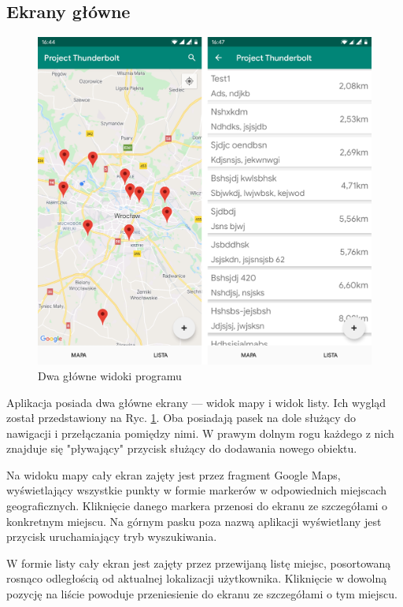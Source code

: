 \documentclass[polish,polish,a4paper,12pt]{article}
\begin{document}
	\subsection{Ekrany główne}

	\begin{figure}[H]
		\centering
		\includegraphics[width = \textwidth]{screenshot-main}
		\caption{Dwa główne widoki programu}
		\label{fig:screenshotmain}
	\end{figure}

	Aplikacja posiada dwa główne ekrany — widok mapy i widok listy. Ich wygląd został przedstawiony na Ryc. \ref{fig:screenshotmain}. Oba posiadają pasek na dole służący do nawigacji i przełączania pomiędzy nimi. W prawym dolnym rogu każdego z nich znajduje się "pływający" przycisk służący do dodawania nowego obiektu.

	Na widoku mapy cały ekran zajęty jest przez fragment Google Maps, wyświetlający wszystkie punkty w formie markerów w odpowiednich miejscach geograficznych. Kliknięcie danego markera przenosi do ekranu ze szczegółami o konkretnym miejscu. Na górnym pasku poza nazwą aplikacji wyświetlany jest przycisk uruchamiający tryb wyszukiwania.

	W formie listy cały ekran jest zajęty przez przewijaną listę miejsc, posortowaną rosnąco odległością od aktualnej lokalizacji użytkownika. Kliknięcie w dowolną pozycję na liście powoduje przeniesienie do ekranu ze szczegółami o tym miejscu.
\end{document}
